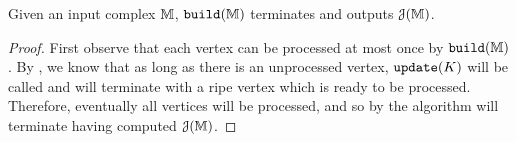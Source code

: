 \begin{theorem}
\label{thm:correct}
 Given an input complex $\mathbb{M}$, ${\tt build}(\mathbb{M})$ terminates and outputs ${\cal J}(\mathbb{M})$.
\end{theorem}
\begin{proof}
 First observe that each vertex can be processed at most once by ${\tt build}(\mathbb{M})$.  By , we know that as long as there 
 is an unprocessed vertex, ${\tt update}(K)$ will be called and will terminate with a ripe vertex which is ready to be processed. 
 Therefore, eventually all vertices will be processed, and so by  the algorithm will terminate having 
 computed ${\cal J}(\mathbb{M})$.
\end{proof}

% 
% 


